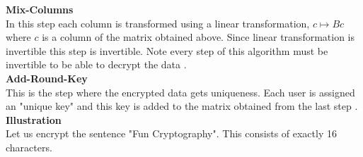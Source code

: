 \documentclass[a4paper,twoside,10pt]{article}
\theoremstyle{plain}
\theoremstyle{definition}
\begin{document}
\noindent
\textbf{Mix-Columns} \\[1mm]
In this step each column is transformed using a linear transformation, \(c \mapsto Bc\) where \(c\) is a column of the matrix obtained above. Since linear transformation is invertible this step is invertible. Note every step of this algorithm must be invertible to be able to decrypt the data \cite{aes}. \\[2mm]

\noindent
\textbf{Add-Round-Key} \\[1mm]
This is the step where the encrypted data gets uniqueness. Each user is assigned an "unique key" and this key is added to the matrix obtained from the last step \cite{aes}.\\[3mm]

\noindent
\textbf{Illustration}\\
Let us encrypt the sentence "Fun Cryptography". This consists of exactly 16 characters.
\end{document}
